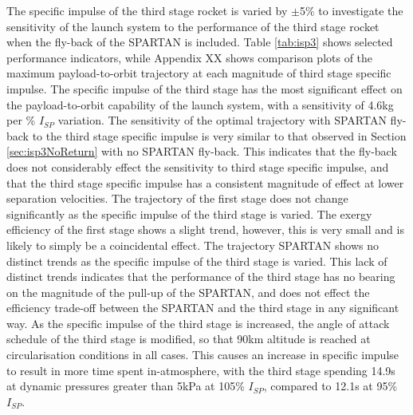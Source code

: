 The specific impulse of the third stage rocket is varied by $\pm$5\% to investigate the sensitivity of the launch system to the performance of the third stage rocket when the fly-back of the SPARTAN is included. 
Table \ref{tab:isp3} shows selected performance indicators, while Appendix XX shows comparison plots of the maximum payload-to-orbit trajectory at each magnitude of third stage specific impulse. 
The specific impulse of the third stage has the most significant effect on the payload-to-orbit capability of the launch system, with a sensitivity of 4.6kg per \% $I_{SP}$ variation. 
The sensitivity of the optimal trajectory with SPARTAN fly-back to the third stage specific impulse is very similar to that observed in Section \ref{sec:isp3NoReturn} with no SPARTAN fly-back. This indicates that the fly-back does not considerably effect the sensitivity to third stage specific impulse, and that the third stage specific impulse has a consistent magnitude of effect at lower separation velocities. 
The trajectory of the first stage does not change significantly as the specific impulse of the third stage is varied. 
The exergy efficiency of the first stage shows a slight trend, however, this is very small and is likely to simply be a coincidental effect. 
The trajectory SPARTAN shows no distinct trends as the specific impulse of the third stage is varied. This lack of distinct trends indicates that the performance of the third stage has no bearing on the magnitude of the pull-up of the SPARTAN, and does not effect the efficiency trade-off between the SPARTAN and the third stage in any significant way. 
As the specific impulse of the third stage is increased, the angle of attack schedule of the third stage is modified, so that 90km altitude is reached at circularisation conditions in all cases. This causes an increase in specific impulse to result in more time spent in-atmosphere, with the third stage spending 14.9s at dynamic pressures greater than 5kPa at 105\% $I_{SP}$, compared to 12.1s at 95\% $I_{SP}$. 




